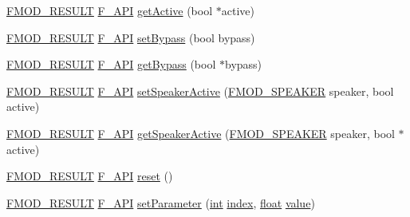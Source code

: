 \begin{DoxyCompactItemize}
\hyperlink{fmod_8h_ae6ddadf8cb315e93ae7e6456b19db276}{F\-M\-O\-D\-\_\-\-R\-E\-S\-U\-L\-T} \hyperlink{fmod_8h_ace803d13e798b0cdde4384f9f323b901}{F\-\_\-\-A\-P\-I} \hyperlink{class_f_m_o_d_1_1_d_s_p_ac802a3beb3dfb2dca8cd2717926a3413}{get\-Active} (bool $\ast$active)
\item 
\hyperlink{fmod_8h_ae6ddadf8cb315e93ae7e6456b19db276}{F\-M\-O\-D\-\_\-\-R\-E\-S\-U\-L\-T} \hyperlink{fmod_8h_ace803d13e798b0cdde4384f9f323b901}{F\-\_\-\-A\-P\-I} \hyperlink{class_f_m_o_d_1_1_d_s_p_ac0e9c1d934542b45a8ec39f488de559a}{set\-Bypass} (bool bypass)
\item 
\hyperlink{fmod_8h_ae6ddadf8cb315e93ae7e6456b19db276}{F\-M\-O\-D\-\_\-\-R\-E\-S\-U\-L\-T} \hyperlink{fmod_8h_ace803d13e798b0cdde4384f9f323b901}{F\-\_\-\-A\-P\-I} \hyperlink{class_f_m_o_d_1_1_d_s_p_a019b1b2e5b980dc4d4b70c1c86fe4240}{get\-Bypass} (bool $\ast$bypass)
\item 
\hyperlink{fmod_8h_ae6ddadf8cb315e93ae7e6456b19db276}{F\-M\-O\-D\-\_\-\-R\-E\-S\-U\-L\-T} \hyperlink{fmod_8h_ace803d13e798b0cdde4384f9f323b901}{F\-\_\-\-A\-P\-I} \hyperlink{class_f_m_o_d_1_1_d_s_p_ac8b9504840c96548c383fdead268f10c}{set\-Speaker\-Active} (\hyperlink{fmod_8h_a1870cd80bd38e1ba43eaa81e74d63bdc}{F\-M\-O\-D\-\_\-\-S\-P\-E\-A\-K\-E\-R} speaker, bool active)
\item 
\hyperlink{fmod_8h_ae6ddadf8cb315e93ae7e6456b19db276}{F\-M\-O\-D\-\_\-\-R\-E\-S\-U\-L\-T} \hyperlink{fmod_8h_ace803d13e798b0cdde4384f9f323b901}{F\-\_\-\-A\-P\-I} \hyperlink{class_f_m_o_d_1_1_d_s_p_ace16e6d02305b7d39cb626abb944d054}{get\-Speaker\-Active} (\hyperlink{fmod_8h_a1870cd80bd38e1ba43eaa81e74d63bdc}{F\-M\-O\-D\-\_\-\-S\-P\-E\-A\-K\-E\-R} speaker, bool $\ast$active)
\item 
\hyperlink{fmod_8h_ae6ddadf8cb315e93ae7e6456b19db276}{F\-M\-O\-D\-\_\-\-R\-E\-S\-U\-L\-T} \hyperlink{fmod_8h_ace803d13e798b0cdde4384f9f323b901}{F\-\_\-\-A\-P\-I} \hyperlink{class_f_m_o_d_1_1_d_s_p_ae475150cbc68d5ad5e5be5791ec3961a}{reset} ()
\item 
\hyperlink{fmod_8h_ae6ddadf8cb315e93ae7e6456b19db276}{F\-M\-O\-D\-\_\-\-R\-E\-S\-U\-L\-T} \hyperlink{fmod_8h_ace803d13e798b0cdde4384f9f323b901}{F\-\_\-\-A\-P\-I} \hyperlink{class_f_m_o_d_1_1_d_s_p_abb8a3ad932d399703103da1b752c4fad}{set\-Parameter} (\hyperlink{wglew_8h_a500a82aecba06f4550f6849b8099ca21}{int} \hyperlink{fmod__codec_8h_a57f14e05b1900f16a2da82ade47d0c6d}{index}, \hyperlink{fmod_8h_aeb841aa4b4b5f444b5d739d865b420af}{float} \hyperlink{fmod__dsp_8h_a6a4f8a1a444e9080b297963b3db29fe0}{value})
\item 

\end{DoxyCompactItemize}
